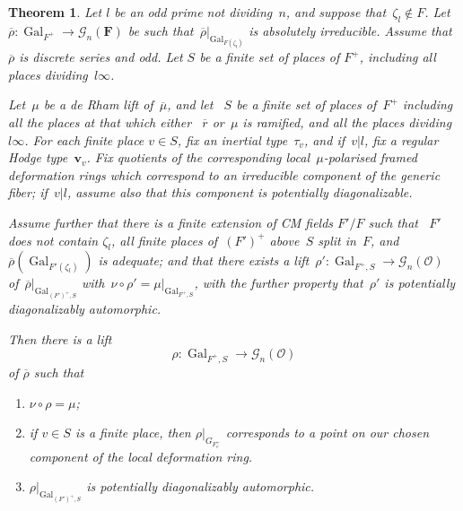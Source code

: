 \documentclass{amsart}
\renewcommand{\mathbb}{\mathbf}
\newcommand{\tv}{{\widetilde{v}}}
\def\ad{\mathrm{ad}}
\newcommand{\mubar}{\overline{\mu}}
\newtheorem{thm}[subsubsection]{Theorem}
\theoremstyle{definition}
\theoremstyle{remark}
\newcommand{\mar}[1]{}
\newcommand{\mar}[1]{\marginpar{\raggedright\tiny squirrel #1}}
\newcommand{\F}{\FF}
\newcommand{\Q}{\QQ}
\newcommand{\FF}{{\mathbb F}}
\newcommand{\QQ}{{\mathbb Q}}
\newcommand{\bv}{\ensuremath{\mathbf{v}}}
\newcommand{\cG}{{\mathcal G}}
\newcommand{\cO}{{\mathcal O}}
\DeclareMathOperator{\Gal}{Gal}
\newcommand{\rhobar}{\overline{\rho}}
\newcommand{\rbar}{\overline{r}}
\begin{document}
\begin{thm}\label{diaglift} Let $l$ be an
  odd prime not dividing~$n$, and suppose that~$\zeta_l\notin F$. Let~$\rhobar:\Gal_{F^+}\to\cG_n(\F) $ be such
  that~$\rhobar|_{\Gal_{F(\zeta_l)}}$ is absolutely irreducible. Assume that~$\rhobar$ is
  discrete series and odd. %
  Let $S$ be a finite set of places of $F^+$,
  including all places dividing~$l\infty$. %


Let~$\mu$ be a de Rham
  lift of~$\mubar$, and let ~$S$ be a finite set of 
  places of~$F^+$ including all the places at  that which either
  ~$\rbar$ or~$\mu$ is ramified, and all the places dividing~$l\infty$.
 For each finite place $v\in S$, fix an inertial type~$\tau_v$, and
 if~$v|l$, fix a regular Hodge type~$\bv_v$. Fix quotients of the
 corresponding local~$\mu$-polarised framed deformation rings which
 correspond to an irreducible component of the generic fiber;
 if~$v|l$, assume also that this component is potentially
 diagonalizable. 





Assume further that there is a finite extension of CM fields $F'/F$
such that~ $F'$ does not contain $\zeta_l$, all finite places
of~$(F')^+$ above~$S$ split in~$F$, and $\rhobar(\Gal_{F'(\zeta_l)})$ is
adequate; and that there exists a
lift~$\rho':\Gal_{F^+,S}\to\cG_n(\cO)$ of~$\rhobar|_{\Gal_{(F')^+,S}}$
with~$\nu\circ \rho'=\mu|_{\Gal_{F^+,S}}$, with the further property
that~$\rho'$ is potentially diagonalizably automorphic.


Then there
is a lift
\[ \rho:\Gal_{F^+,S} \longrightarrow \cG_n(\cO) \]
of $\rhobar$ such that
\begin{enumerate}
\item $\nu \circ \rho = \mu$;
\item if $v \in S$ is a finite place, then ${\rho}|_{G_{F^+_v}}$
  corresponds to a point on our chosen component of the local
  deformation ring.
\item $\rho|_{\Gal_{(F')^+,S}}$ is potentially diagonalizably automorphic.
\end{enumerate} \end{thm}
\end{document}
